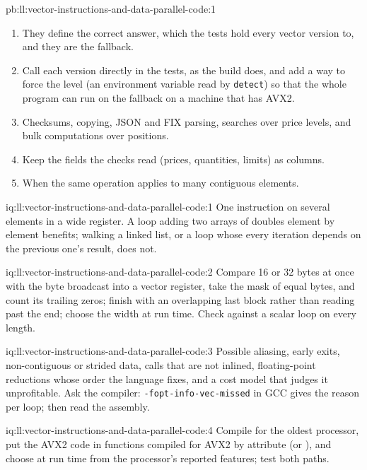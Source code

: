 \begin{solution}{pb:ll:vector-instructions-and-data-parallel-code:1}
\begin{enumerate}
\item They define the correct answer, which the tests hold every vector version to, and they are the fallback.
\item Call each version directly in the tests, as the build does, and add a way to force the level (an environment variable
read by \texttt{detect}) so that the whole program can run on the fallback on a machine that has AVX2.
\item Checksums, copying, JSON and FIX parsing, searches over price levels, and bulk computations over positions.
\item Keep the fields the checks read (prices, quantities, limits) as columns.
\item When the same operation applies to many contiguous elements.
\end{enumerate}
\end{solution}

\begin{solution}{iq:ll:vector-instructions-and-data-parallel-code:1}
One instruction on several elements in a wide register. A loop adding two arrays of doubles element by element benefits;
walking a linked list, or a loop whose every iteration depends on the previous one's result, does not.
\end{solution}

\begin{solution}{iq:ll:vector-instructions-and-data-parallel-code:2}
Compare 16 or 32 bytes at once with the byte broadcast into a vector register, take the mask of equal bytes, and count its
trailing zeros; finish with an overlapping last block rather than reading past the end; choose the width at run time.
Check against a scalar loop on every length.
\end{solution}

\begin{solution}{iq:ll:vector-instructions-and-data-parallel-code:3}
Possible aliasing, early exits, non-contiguous or strided data, calls that are not inlined, floating-point reductions whose
order the language fixes, and a cost model that judges it unprofitable. Ask the compiler: \texttt{-fopt-info-vec-missed} in
GCC gives the reason per loop; then read the assembly.
\end{solution}

\begin{solution}{iq:ll:vector-instructions-and-data-parallel-code:4}
Compile for the oldest processor, put the AVX2 code in functions compiled for AVX2 by attribute (or ), and choose at run time from the processor's reported features; test both paths.
\end{solution}

